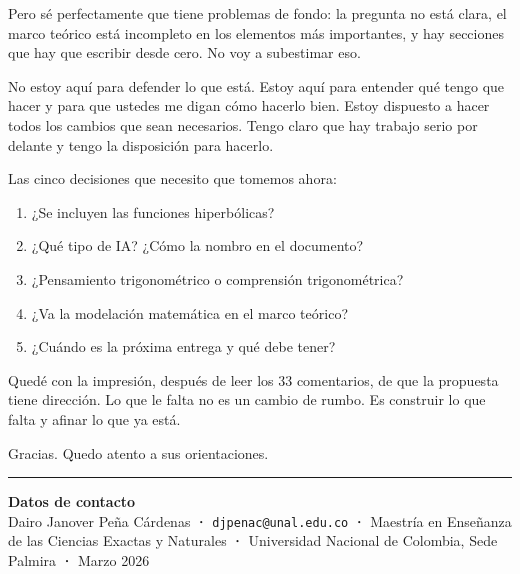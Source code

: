 \documentclass[11pt, letterpaper]{article}
\begin{document}
Pero sé perfectamente que tiene problemas de fondo: la pregunta no está clara, el marco teórico está incompleto en los elementos más importantes, y hay secciones que hay que escribir desde cero. No voy a subestimar eso.

No estoy aquí para defender lo que está. Estoy aquí para entender qué tengo que hacer y para que ustedes me digan cómo hacerlo bien. Estoy dispuesto a hacer todos los cambios que sean necesarios. Tengo claro que hay trabajo serio por delante y tengo la disposición para hacerlo.

\begin{clave}
  Las cinco decisiones que necesito que tomemos ahora:
  \begin{enumerate}[noitemsep]
    \item ¿Se incluyen las funciones hiperbólicas?
    \item ¿Qué tipo de IA? ¿Cómo la nombro en el documento?
    \item ¿Pensamiento trigonométrico o comprensión trigonométrica?
    \item ¿Va la modelación matemática en el marco teórico?
    \item ¿Cuándo es la próxima entrega y qué debe tener?
  \end{enumerate}
\end{clave}

Quedé con la impresión, después de leer los 33 comentarios, de que la propuesta tiene dirección. Lo que le falta no es un cambio de rumbo. Es construir lo que falta y afinar lo que ya está.

Gracias. Quedo atento a sus orientaciones.

\bigskip
\begin{center}
  {\color{VerdeUNAL}\rule{0.5\linewidth}{0.8pt}}
\end{center}

\vfill
\begin{tcolorbox}[colback=GrisFondo, colframe=GrisClaro, arc=2mm]
  \small
  \textbf{Datos de contacto} \\
  Dairo Janover Peña Cárdenas \textbf{·}
  \texttt{djpenac@unal.edu.co} \textbf{·}
  Maestría en Enseñanza de las Ciencias Exactas y Naturales \textbf{·}
  Universidad Nacional de Colombia, Sede Palmira \textbf{·}
  Marzo 2026
\end{tcolorbox}
\end{document}
